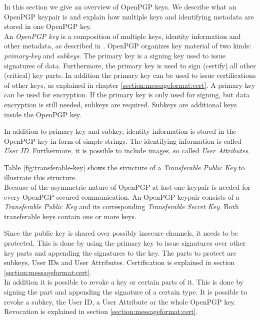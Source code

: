 In this section we give an overview of OpenPGP keys. We describe what an OpenPGP keypair is and explain how multiple keys and identifying metadata are stored in one OpenPGP key. \\

An \textit{OpenPGP key} is a composition of multiple keys, identity information and other metadata, as described in  \cite[section 11.1]{RFC4880}. OpenPGP organizes key material of two kinds: \textit{primary-key} and \textit{subkeys}. The primary key is a signing key used to issue signatures of data. Furthermore, the primary key is used to sign (certify) all other (critical) key parts. In addition the primary key can be used to issue certifications of other keys, as explained in chapter \ref{section:messageformat:cert}. A primary key can be used for encryption. If the primary key is only used for signing, but data encryption is still needed, subkeys are required. Subkeys are additional keys inside the OpenPGP key. 

In addition to primary key and subkey, identity information is stored in the OpenPGP key in form of simple strings. The identifying information is called \textit{User ID}. Furthermore, it is possible to include images, so called \textit{User Attributes}. 

Table \ref{fig:transferable-key} shows the structure of a \textit{Transferable Public Key} to illustrate this structure. \\

Because of the  asymmetric nature of OpenPGP at last one keypair is needed for every OpenPGP secured communication. An OpenPGP keypair consists of a \textit{Transferable Public Key} and its corresponding \textit{Transferable Secret Key}. Both transferable keys contain one or more keys. 


Since the public key is shared over possibly insecure channels, it needs to be protected. This is done by using the primary key to issue signatures over other key parts and appending the signatures to the key. The parts to protect are subkeys, User IDs and User Attributes. Certification is explained in section \ref{section:messageformat:cert}. \\


In addition it is possible to revoke a key or certain parts of it. This is done by signing the part and appending the signature of a certain type. It is possible to revoke a subkey, the User ID, a User Attribute or the whole OpenPGP key. Revocation is explained in section \ref{section:messageformat:cert}.


